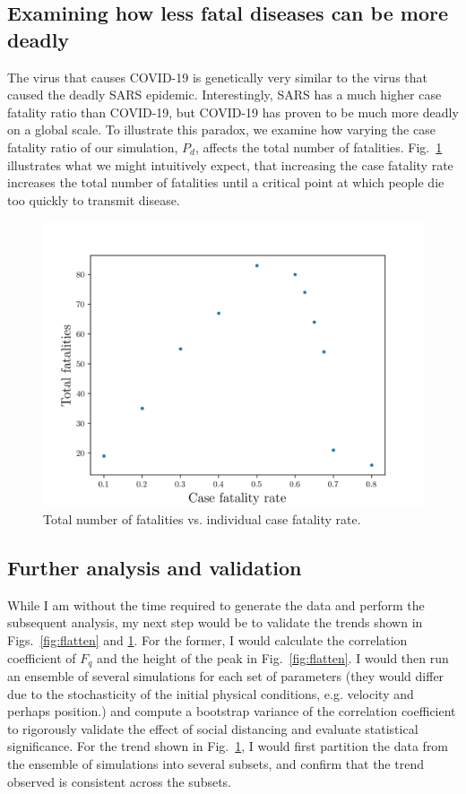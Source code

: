 \documentclass[11pt]{article}
\begin{document}
\subsection{Examining how less fatal diseases can be more deadly}
The virus that causes COVID-19 is genetically very similar to the virus that caused the deadly SARS epidemic. Interestingly, SARS has a much higher case fatality ratio than COVID-19, but COVID-19 has proven to be much more deadly on a global scale. To illustrate this paradox, we examine how varying the case fatality ratio of our simulation, $P_d$, affects the total number of fatalities. Fig.~\ref{fig:death_vs_cfr} illustrates what we might intuitively expect, that increasing the case fatality rate increases the total number of fatalities until a critical point at which people die too quickly to transmit disease.
\begin{figure}[h]
    \centering
    \includegraphics[scale=.6]{figs/total_deaths.png}
    \caption{Total number of fatalities vs. individual case fatality rate.}\label{fig:death_vs_cfr}
\end{figure}
\subsection{Further analysis and validation}
While I am without the time required to generate the data and perform the subsequent analysis, my next step would be to validate the trends shown in Figs.~\ref{fig:flatten} and \ref{fig:death_vs_cfr}. For the former, I would calculate the correlation coefficient of $F_q$ and the height of the peak in Fig.~\ref{fig:flatten}. I would then run an ensemble of several simulations for each set of parameters (they would differ due to the stochasticity of the initial physical conditions, e.g. velocity and perhaps position.) and compute a bootstrap variance of the correlation coefficient to rigorously validate the effect of social distancing and evaluate statistical significance. For the trend shown in Fig.~\ref{fig:death_vs_cfr}, I would first partition the data from the ensemble of simulations into several subsets, and confirm that the trend observed is consistent across the subsets.
\end{document}
